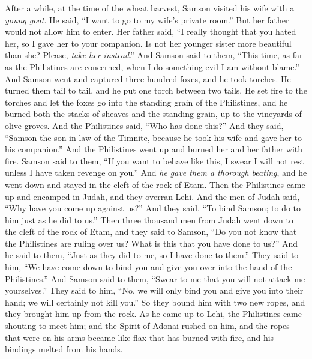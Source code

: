 \begin{biblechapter} %
 After a while, at the time of the wheat harvest, Samson visited his wife with a \textit{young goat}. He said, “I want to go to my wife’s private room.” But her father would not allow him to enter.
\verse Her father said, “I really thought that you hated her, so I gave her to your companion. Is not her younger sister more beautiful than she? Please, \textit{take her instead}.”
\verse And Samson said to them, “This time, as far as the Philistines are concerned, when I do something evil I am without blame.”
\verse And Samson went and captured three hundred foxes, and he took torches. He turned them tail to tail, and he put one torch between two tails.
\verse He set fire to the torches and let the foxes go into the standing grain of the Philistines, and he burned both the stacks of sheaves and the standing grain, up to the vineyards of olive groves.
\verse And the Philistines said, “Who has done this?” And they said, “Samson the son-in-law of the Timnite, because he took his wife and gave her to his companion.” And the Philistines went up and burned her and her father with fire.
\verse Samson said to them, “If you want to behave like this, I swear I will not rest unless I have taken revenge on you.”
\verse And \textit{he gave them a thorough beating}, and he went down and stayed in the cleft of the rock of Etam.
\verse Then the Philistines came up and encamped in Judah, and they overran Lehi.
\verse And the men of Judah said, “Why have you come up against us?” And they said, “To bind Samson; to do to him just as he did to us.”
\verse Then three thousand men from Judah went down to the cleft of the rock of Etam, and they said to Samson, “Do you not know that the Philistines are ruling over us? What is this that you have done to us?” And he said to them, “Just as they did to me, so I have done to them.”
\verse They said to him, “We have come down to bind you and give you over into the hand of the Philistines.” And Samson said to them, “Swear to me that you will not attack me yourselves.”
\verse They said to him, “No, we will only bind you and give you into their hand; we will certainly not kill you.” So they bound him with two new ropes, and they brought him up from the rock.
\verse As he came up to Lehi, the Philistines came shouting to meet him; and the Spirit of Adonai rushed on him, and the ropes that were on his arms became like flax that has burned with fire, and his bindings melted from his hands.

\end{biblechapter}
